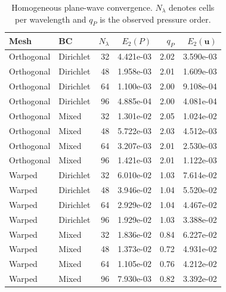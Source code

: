 \begin{table}[htbp]
\centering
\begin{tabular}{llrrrr}
\toprule
Mesh & BC & $N_\lambda$ & $E_2(P)$ & $q_P$ & $E_2(\mathbf{u})$ \\
\midrule
Orthogonal & Dirichlet & 32 & 4.421e-03 & 2.02 & 3.590e-03 \\
Orthogonal & Dirichlet & 48 & 1.958e-03 & 2.01 & 1.609e-03 \\
Orthogonal & Dirichlet & 64 & 1.100e-03 & 2.00 & 9.108e-04 \\
Orthogonal & Dirichlet & 96 & 4.885e-04 & 2.00 & 4.081e-04 \\
Orthogonal & Mixed & 32 & 1.301e-02 & 2.05 & 1.024e-02 \\
Orthogonal & Mixed & 48 & 5.722e-03 & 2.03 & 4.512e-03 \\
Orthogonal & Mixed & 64 & 3.207e-03 & 2.01 & 2.530e-03 \\
Orthogonal & Mixed & 96 & 1.421e-03 & 2.01 & 1.122e-03 \\
Warped & Dirichlet & 32 & 6.010e-02 & 1.03 & 7.614e-02 \\
Warped & Dirichlet & 48 & 3.946e-02 & 1.04 & 5.520e-02 \\
Warped & Dirichlet & 64 & 2.929e-02 & 1.04 & 4.467e-02 \\
Warped & Dirichlet & 96 & 1.929e-02 & 1.03 & 3.388e-02 \\
Warped & Mixed & 32 & 1.836e-02 & 0.84 & 6.227e-02 \\
Warped & Mixed & 48 & 1.373e-02 & 0.72 & 4.931e-02 \\
Warped & Mixed & 64 & 1.105e-02 & 0.76 & 4.212e-02 \\
Warped & Mixed & 96 & 7.930e-03 & 0.82 & 3.392e-02 \\
\bottomrule
\end{tabular}
\caption{Homogeneous plane-wave convergence. $N_\lambda$ denotes cells per wavelength and $q_P$ is the observed pressure order.}
\label{tab:homogeneousConvergence}
\end{table}
